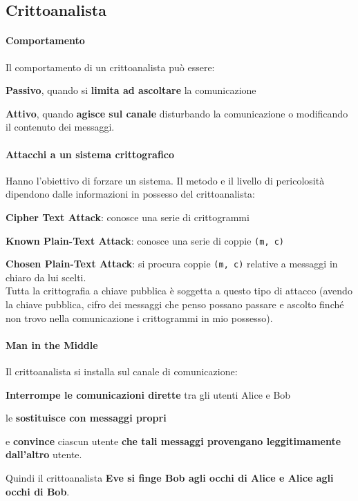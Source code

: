 \documentclass[10pt]{book}
\begin{document}
\subsection{Crittoanalista}
\paragraph{Comportamento} Il comportamento di un crittoanalista può essere:
\begin{list}{}{}
	\item \textbf{Passivo}, quando si \textbf{limita ad ascoltare} la comunicazione
	\item \textbf{Attivo}, quando \textbf{agisce sul canale} disturbando la comunicazione o modificando il contenuto dei messaggi.
\end{list}
\paragraph{Attacchi a un sistema crittografico} Hanno l'obiettivo di forzare un sistema. Il metodo e il livello di pericolosità dipendono dalle informazioni in possesso del crittoanalista:
\begin{list}{}{}
	\item \textbf{Cipher Text Attack}: conosce una serie di crittogrammi
	\item \textbf{Known Plain-Text Attack}: conosce una serie di coppie \texttt{(m, c)}
	\item \textbf{Chosen Plain-Text Attack}: si procura coppie \texttt{(m, c)} relative a messaggi in chiaro da lui scelti.\\
	Tutta la crittografia a chiave pubblica è soggetta a questo tipo di attacco (avendo la chiave pubblica, cifro dei messaggi che penso possano passare e ascolto finché non trovo nella comunicazione i crittogrammi in mio possesso).
\end{list}
\paragraph{Man in the Middle} Il crittoanalista si installa sul canale di comunicazione:
\begin{list}{}{}
	\item \textbf{Interrompe le comunicazioni dirette} tra gli utenti Alice e Bob
	\item le \textbf{sostituisce con messaggi propri}
	\item e \textbf{convince} ciascun utente \textbf{che tali messaggi provengano leggitimamente dall'altro} utente.
\end{list}
Quindi il crittoanalista \textbf{Eve si finge Bob agli occhi di Alice e Alice agli occhi di Bob}.
\end{document}
